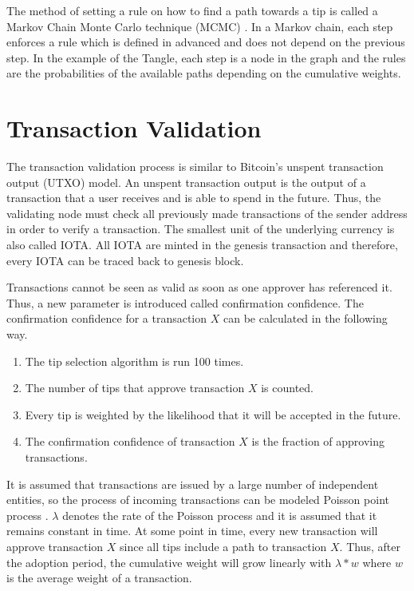 The method of setting a rule on how to find a path towards a tip is called a Markov Chain Monte Carlo technique (MCMC) \cite{mcmc}. In a Markov chain, each step enforces a rule which is defined in advanced and does not depend on the previous step. In the example of the Tangle, each step is a node in the graph and the rules are the probabilities of the available paths depending on the cumulative weights.

\section{Transaction Validation}\label{transaction-validation}
The transaction validation process is similar to Bitcoin's unspent transaction output (UTXO) model. An unspent transaction output is the output of a transaction that a user receives and is able to spend in the future. Thus, the validating node must check all previously made transactions of the sender address in order to verify a transaction. The smallest unit of the underlying currency is also called IOTA. All IOTA are minted in the genesis transaction and therefore, every IOTA can be traced back to genesis block. 

Transactions cannot be seen as valid as soon as one approver has referenced it. Thus, a new parameter is introduced called confirmation confidence. The confirmation confidence for a transaction $X$ can be calculated in the following way.

\begin{enumerate}
    \item The tip selection algorithm is run 100 times.
    \item The number of tips that approve transaction $X$ is counted.
    \item Every tip is weighted by the likelihood that it will be accepted in the future.
    \item The confirmation confidence of transaction $X$ is the fraction of approving transactions.
\end{enumerate}

It is assumed that transactions are issued by a large number of independent entities, so the process of incoming transactions can be modeled Poisson point process \cite{the-tangle}. $\lambda$ denotes the rate of the Poisson process and it is assumed that it remains constant in time. At some point in time, every new transaction will approve transaction $X$ since all tips include a path to transaction $X$. Thus, after the adoption period, the cumulative weight will grow linearly with $\lambda * w$ where $w$ is the average weight of a transaction.

